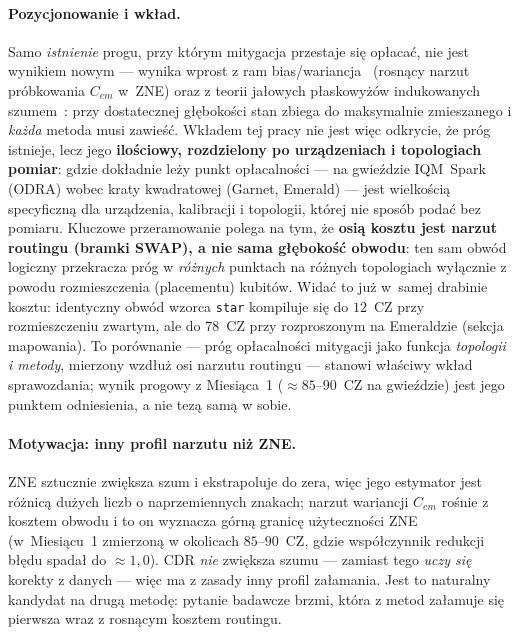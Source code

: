 \documentclass[11pt,a4paper]{article}
\begin{document}
\paragraph{Pozycjonowanie i wkład.} Samo \emph{istnienie} progu, przy którym mitygacja przestaje
się opłacać, nie jest wynikiem nowym --- wynika wprost z ram bias/wariancja~\cite{cai2023}
(rosnący narzut próbkowania $C_{em}$ w~ZNE) oraz z teorii jałowych płaskowyżów indukowanych
szumem~\cite{wang2021}: przy
dostatecznej głębokości stan zbiega do maksymalnie zmieszanego i \emph{każda} metoda musi zawieść.
Wkładem tej pracy nie jest więc odkrycie, że próg istnieje, lecz jego \textbf{ilościowy,
rozdzielony po urządzeniach i topologiach pomiar}: gdzie dokładnie leży punkt opłacalności --- na
gwieździe IQM~Spark (ODRA) wobec kraty kwadratowej (Garnet, Emerald) --- jest wielkością
specyficzną dla urządzenia, kalibracji i topologii, której nie sposób podać bez pomiaru.
Kluczowe przeramowanie polega na tym, że \textbf{osią kosztu jest narzut routingu (bramki SWAP),
a nie sama głębokość obwodu}: ten sam obwód logiczny przekracza próg w \emph{różnych} punktach na
różnych topologiach wyłącznie z powodu rozmieszczenia (placementu) kubitów. Widać to już w~samej
drabinie kosztu: identyczny obwód wzorca \texttt{star} kompiluje się do $12$~CZ przy rozmieszczeniu
zwartym, ale do $78$~CZ przy rozproszonym na Emeraldzie (sekcja mapowania). To porównanie --- próg
opłacalności mitygacji jako funkcja \emph{topologii i metody}, mierzony wzdłuż osi narzutu
routingu --- stanowi właściwy wkład sprawozdania; wynik progowy z Miesiąca~1 (${\approx}85$--$90$~CZ
na gwieździe) jest jego punktem odniesienia, a nie tezą samą w sobie.

\paragraph{Motywacja: inny profil narzutu niż ZNE.} ZNE sztucznie zwiększa szum i ekstrapoluje do
zera, więc jego estymator jest różnicą dużych liczb o naprzemiennych znakach; narzut wariancji
$C_{em}$ rośnie z kosztem obwodu i to on wyznacza górną granicę użyteczności ZNE (w~Miesiącu~1
zmierzoną w okolicach $85$--$90$~CZ, gdzie współczynnik redukcji błędu spadał do ${\approx}1{,}0$).
CDR \emph{nie} zwiększa szumu --- zamiast tego \emph{uczy się} korekty z danych --- więc ma z zasady
inny profil załamania. Jest to naturalny kandydat na drugą metodę: pytanie badawcze brzmi, która
z metod załamuje się pierwsza wraz z rosnącym kosztem routingu.
\end{document}
